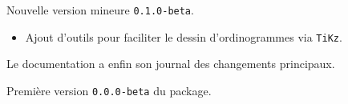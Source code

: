 \documentclass[12pt,a4paper]{article}
\theoremstyle{definition}
\begin{document}
\begin{description}[leftmargin=1em]
    \setlength\itemsep{1em}



    \item[2019-10-19] Nouvelle version mineure \verb+0.1.0-beta+.
    \begin{itemize}
        \item Ajout d'outils pour faciliter le dessin d'ordinogrammes via \verb+TiKz+.
    \end{itemize} 



    \item[2019-10-18] Le documentation a enfin son journal des changements principaux.



    \item[2019-09-03] Première version \verb+0.0.0-beta+ du package.
\end{description}
\end{document}
